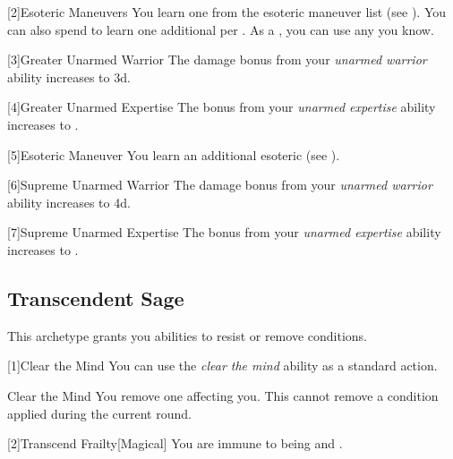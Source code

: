         [2]{Esoteric Maneuvers} 
        You learn one  from the esoteric maneuver list (see ).
        You can also spend  to learn one additional  per .
        As a , you can use any  you know.




        [3]{Greater Unarmed Warrior} The damage bonus from your \textit{unarmed warrior} ability increases to \plus3d.

        [4]{Greater Unarmed Expertise}
        The bonus from your \textit{unarmed expertise} ability increases to .

        [5]{Esoteric Maneuver} You learn an additional esoteric  (see ).

        [6]{Supreme Unarmed Warrior} The damage bonus from your \textit{unarmed warrior} ability increases to \plus4d.

        [7]{Supreme Unarmed Expertise} The bonus from your \textit{unarmed expertise} ability increases to .

    \subsection{Transcendent Sage}
        This archetype grants you abilities to resist or remove conditions.

        [1]{Clear the Mind} You can use the \textit{clear the mind} ability as a standard action.
        \begin{freeability}{Clear the Mind}
            You remove one  affecting you.
            This cannot remove a condition applied during the current round.
        \end{freeability}

        [2]{Transcend Frailty}[Magical]
        You are immune to being  and .

